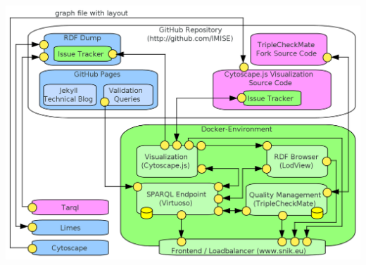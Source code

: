 \documentclass{beamer}
\begin{document}

\begin{frame}
\includegraphics[width=\textwidth]{img/architecture.png}
\end{frame}
\end{document}
